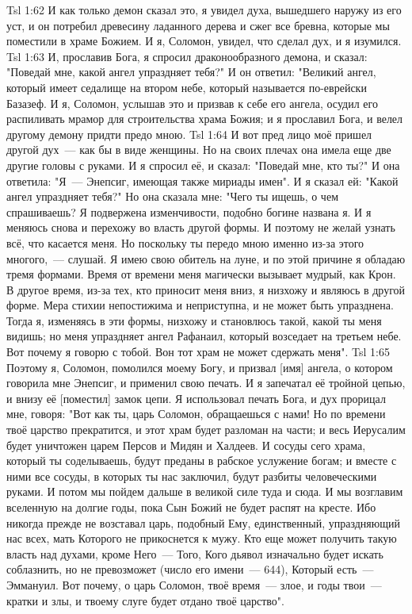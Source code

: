 \vs Tsl 1:62 
И как только демон сказал это, я увидел духа, вышедшего наружу из его уст, и он потребил древесину ладанного дерева и сжег все бревна, которые мы поместили в храме Божием. И я, Соломон, увидел, что сделал дух, и я изумился.
\vs Tsl 1:63 
И, прославив Бога, я спросил драконообразного демона, и сказал: "Поведай мне, какой ангел упраздняет тебя?" И он ответил: "Великий ангел, который имеет седалище на втором небе, который называется по-еврейски Базазеф. И я, Соломон, услышав это и призвав к себе его ангела, осудил его распиливать мрамор для строительства храма Божия; и я прославил Бога, и велел другому демону придти предо мною.
\vs Tsl 1:64 
И вот пред лицо моё пришел другой дух~--- как бы в виде женщины. Но на своих плечах она имела еще две другие головы с руками. И я спросил её, и сказал: "Поведай мне, кто ты?" И она ответила: "Я~--- Энепсиг, имеющая также мириады имен". И я сказал ей: "Какой ангел упраздняет тебя?" Но она сказала мне: "Чего ты ищешь, о чем спрашиваешь? Я подвержена изменчивости, подобно богине названа я. И я меняюсь снова и перехожу во власть другой формы. И поэтому не желай узнать всё, что касается меня. Но поскольку ты передо мною именно из-за этого многого,~--- слушай. Я имею свою обитель на луне, и по этой причине я обладаю тремя формами. Время от времени меня магически вызывает мудрый, как Крон. В другое время, из-за тех, кто приносит меня вниз, я низхожу и являюсь в другой форме. Мера стихии непостижима и неприступна, и не может быть упразднена. Тогда я, изменяясь в эти формы, низхожу и становлюсь такой, какой ты меня видишь; но меня упраздняет ангел Рафанаил, который возседает на третьем небе. Вот почему я говорю с тобой. Вон тот храм не может сдержать меня".
\vs Tsl 1:65 
Поэтому я, Соломон, помолился моему Богу, и призвал [имя] ангела, о котором говорила мне Энепсиг, и применил свою печать. И я запечатал её тройной цепью, и внизу её [поместил] замок цепи. Я использовал печать Бога, и дух прорицал мне, говоря: "Вот как ты, царь Соломон, обращаешься с нами! Но по времени твоё царство прекратится, и этот храм будет разломан на части; и весь Иерусалим будет уничтожен царем Персов и Мидян и Халдеев. И сосуды сего храма, который ты соделываешь, будут преданы в рабское услужение богам; и вместе с ними все сосуды, в которых ты нас заключил, будут разбиты человеческими руками. И потом мы пойдем дальше в великой силе туда и сюда. И мы возглавим вселенную на долгие годы, пока Сын Божий не будет распят на кресте. Ибо никогда прежде не возставал царь, подобный Ему, единственный, упраздняющий нас всех, мать Которого не прикоснется к мужу. Кто еще может получить такую власть над духами, кроме Него~--- Того, Кого дьявол изначально будет искать соблазнить, но не превозможет (число его имени~--- 644), Который есть~--- Эммануил. Вот почему, о царь Соломон, твоё время~--- злое, и годы твои~--- кратки и злы, и твоему слуге будет отдано твоё царство".
